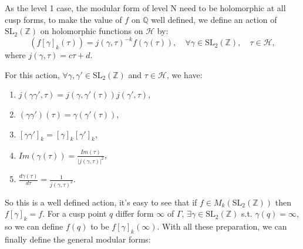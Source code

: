     As the level 1 case, the modular form of level N need to be holomorphic at all cusp forms, to make the value of $f$ on $\mathbb{Q}$ well defined, we define an action of $\mathrm{SL}_2(\mathbb{Z})$ on holomorphic functions on $\mathcal{H}$ by: $$(f[\gamma]_k(\tau))=j(\gamma, \tau)^{-k}f(\gamma(\tau)), \quad \forall \gamma\in \mathrm{SL}_2(\mathbb{Z}) , \quad\tau \in \mathcal{H},$$ where $ j(\gamma, \tau)=c\tau+d$.

    \begin{lemma}
        For this action, $\forall \gamma, \gamma'\in \mathrm{SL}_2(\mathbb{Z})$ and $\tau\in \mathcal{H}$, we have:
        \begin{enumerate}
            \item $j(\gamma\gamma',\tau)=j(\gamma,\gamma'(\tau))j(\gamma',\tau)$,
            \item $(\gamma\gamma')(\tau)=\gamma(\gamma'(\tau))$,
            \item $[\gamma\gamma']_k=[\gamma]_k[\gamma']_k$,
            \item $Im(\gamma(\tau))=\frac{Im(\tau)}{\vert j(\gamma,\tau)\vert^2}$,
            \item $\frac{d\gamma(\tau)}{d\tau}=\frac{1}{j(\gamma,\tau)^2}$.
        \end{enumerate}
    \end{lemma}

    So this is a well defined action, it's easy to see that if $f\in M_k(\mathrm{SL}_2(\mathbb{Z}))$ then $f[\gamma]_k=f$. For a cusp point $q$ differ form $\infty$ of $\Gamma$, $\exists \gamma \in \mathrm{SL}_2(\mathbb{Z})$ s.t. $\gamma(q)=\infty$, so we can define $f(q)$ to be $f[\gamma]_k(\infty)$. With all these preparation, we can finally define the general modular forms:


